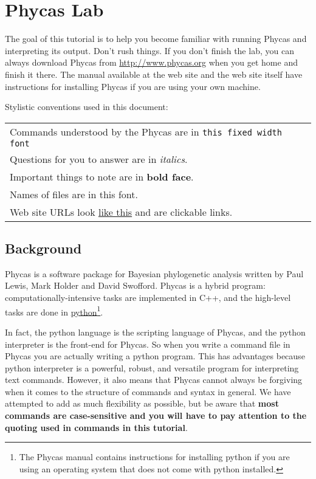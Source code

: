 \documentclass{article}
\newcommand{\cmd}[1]{\texttt{#1}\xspace}
\newcommand{\phycas}{Phycas\xspace}
\newcommand{\localfile}[1]{\textsf{#1}\xspace}
\begin{document}
\tableofcontents


\newpage
\section{\phycas Lab}

The goal of this tutorial is to help you become familiar with running \phycas and interpreting its output. 
Don't rush things. 
If you don't finish the lab, you can always download 
\phycas from \url{http://www.phycas.org} when you get home and finish it there.
The manual available at the web site and the web site itself have instructions for 
installing \phycas if you are using your own machine.

Stylistic conventions used in this document:

\begin{tabular}{l}
	Commands understood by the \phycas are in \cmd{this fixed width font} \\
	Questions for you to answer are in {\em italics}. \\
	Important things to note are in {\bf bold face}. \\
	Names of files \localfile{are in  this font}.\\
	Web site URLs look \href{http://www.google.com}{like this} and are clickable links.
\end{tabular}

\subsection{Background}
\phycas is a software package for Bayesian phylogenetic analysis written by Paul Lewis, Mark Holder and David Swofford.
\phycas is a hybrid program: computationally-intensive tasks are implemented in C++, and the high-level
tasks are done in \href{http://www.python.org/}{python}\footnote{The Phycas manual contains instructions for installing python if you are using an operating system
that does not come with python installed.}.

In fact, the python language is the scripting language of \phycas, and the python interpreter is
the front-end for \phycas. 
So when you write a command file in \phycas you are actually writing a python program.
This has advantages because python interpreter is a powerful, robust, and versatile program for interpreting text commands.
However, it also means that \phycas cannot always be forgiving when it comes to the structure of commands and syntax in general.
We have attempted to add as much flexibility as possible, but be aware that {\bf most commands are case-sensitive and you will have to pay attention to the quoting used in commands in this tutorial}.
\end{document}
